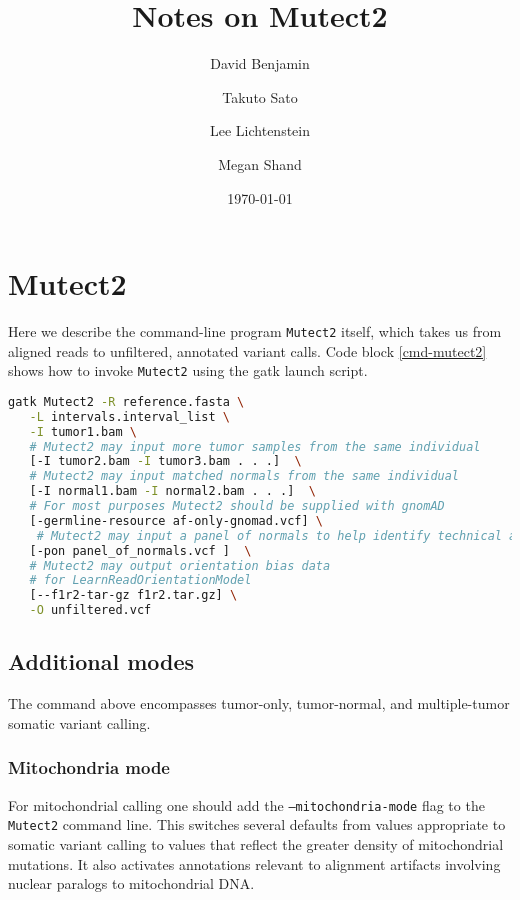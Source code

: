 \documentclass[nofootinbib,amssymb,amsmath]{revtex4}
\newcommand{\code}[1]{\texttt{#1}}
\begin{document}
\title{Notes on Mutect2}
\author{David Benjamin}
\author{Takuto Sato}
\author{Lee Lichtenstein}
\author{Megan Shand}

\date{\today}

\maketitle

\section{Mutect2}
Here we describe the command-line program \code{Mutect2} itself, which takes us from aligned reads to unfiltered, annotated variant calls.  Code block \ref{cmd-mutect2} shows how to invoke \code{Mutect2} using the gatk launch script.

\begin{lstlisting}[language=bash,caption={Mutect2 command}, label={cmd-mutect2}]
gatk Mutect2 -R reference.fasta \
   -L intervals.interval_list \
   -I tumor1.bam \
   # Mutect2 may input more tumor samples from the same individual 
   [-I tumor2.bam -I tumor3.bam . . .]  \
   # Mutect2 may input matched normals from the same individual
   [-I normal1.bam -I normal2.bam . . .]  \
   # For most purposes Mutect2 should be supplied with gnomAD
   [-germline-resource af-only-gnomad.vcf] \
    # Mutect2 may input a panel of normals to help identify technical artifacts
   [-pon panel_of_normals.vcf ]  \
   # Mutect2 may output orientation bias data
   # for LearnReadOrientationModel
   [--f1r2-tar-gz f1r2.tar.gz] \
   -O unfiltered.vcf
\end{lstlisting}

\subsection{Additional modes}
The command above encompasses tumor-only, tumor-normal, and multiple-tumor somatic variant calling.  

\subsubsection{Mitochondria mode}
For mitochondrial calling one should add the \code{--mitochondria-mode} flag to the \code{Mutect2} command line.  This switches several defaults from values appropriate to somatic variant calling to values that reflect the greater density of mitochondrial mutations.  It also activates annotations relevant to alignment artifacts involving nuclear paralogs to mitochondrial DNA.
\end{document}
